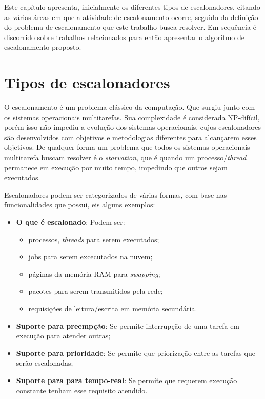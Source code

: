 Este capítulo apresenta, inicialmente os diferentes tipos de escalonadores, citando as várias áreas em que a atividade de escalonamento ocorre, seguido da definição do problema de escalonamento que este trabalho busca resolver. Em sequência é discorrido sobre trabalhos relacionados para então apresentar o algoritmo de escalonamento proposto.

\section{Tipos de escalonadores}
O escalonamento é um problema clássico da computação. Que surgiu junto com os sistemas operacionais multitarefas. Sua complexidade é considerada NP-difícil, porém isso não impediu a evolução dos sistemas operacionais, cujos escalonadores são desenvolvidos com objetivos e metodologias diferentes para alcançarem esses objetivos. De qualquer forma um problema que todos os sistemas operacionais multitarefa buscam resolver é o \textit{starvation}, que é quando um processo/\textit{thread} permanece em execução por muito tempo, impedindo que outros sejam executados.

Escalonadores podem ser categorizados de várias formas, com base nas funcionalidades que possui, eis alguns exemplos:

\begin{itemize}
	\item \textbf{O que é escalonado}: Podem ser:
	\begin{itemize}
		\item processos, \textit{threads} para serem executados;
		\item jobs para serem excecutados na nuvem;
		\item páginas da memória \acrfull{RAM} para \textit{swapping};
		\item pacotes para serem transmitidos pela rede;
		\item requisições de leitura/escrita em memória secundária.
	\end{itemize}
	\item \textbf{Suporte para preempção}: Se permite interrupção de uma tarefa em execução para atender outras;
	\item \textbf{Suporte para prioridade}: Se permite que priorização entre as tarefas que serão escalonadas;
	\item \textbf{Suporte para para tempo-real}: Se permite que requerem execução constante tenham esse requisito atendido.
\end{itemize}


